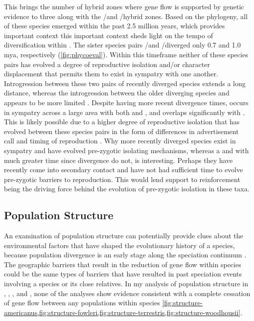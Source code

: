 This brings the number of \anaxyrus hybrid zones where gene flow is supported by genetic evidence to
three along with the \amer/\terr and \amer/\hemiophrys hybrid zones. 
Based on the \phycoeval phylogeny, all of these species emerged within the past 
2.5 million years, which provides important context
this important context sheds light on the tempo of diversification within \anaxyrus.
The sister species pairs \fowl/\wood and \amer/\terr diverged only 0.7 and 1.0 mya,
respectively (\cref{fig:phycoeval}).
Within this timeframe neither of these species pairs has evolved a degree of 
reproductive isolation and/or character displacement that permits them to exist 
in sympatry with one another. 
Introgression between these two pairs of recently diverged species extends a 
long distance, whereas the introgression between the older diverging species 
\amer and \hemiophrys appears to be more limited \parencite{green1983}.
Despite having more recent divergence times, \fowl occurs in sympatry across 
a large area with both \amer and \terr, and \wood overlaps significantly with 
\amer \parencite{conant1998}.
This is likely possible due to a higher degree of reproductive isolation that 
has evolved between these species pairs in the form of differences in 
advertisement call and timing of reproduction \parencite{blair1974}. 
Why more recently diverged species exist in sympatry and have evolved 
pre-zygotic isolating mechanisms, whereas a \amer and \hemiophrys with much 
greater time since divergence do not, is interesting.
Perhaps they have recently come into secondary contact and have not had sufficient
time to evolve pre-zygotic barriers to reproduction. 
This would lend support to reinforcement being the driving force behind the evolution
of pre-zygotic isolation in these taxa. 

\subsection{Population Structure}
An examination of population structure can potentially provide clues about the 
environmental factors that have shaped the evolutionary history of a species,
because population divergence is an early stage along the speciation continuum 
\parencite{mallet2008}.
The geographic barriers that result in the reduction of gene flow within species
could be the same types of barriers that have resulted in past speciation events 
involving a species or its close relatives.
In my analysis of population structure in \amer, \fowl, \terr, and \wood,
none of the \structure analyses show evidence consistent with a complete 
cessation of gene flow between any populations within species 
\cref{fig:structure-americanus,fig:structure-fowleri,fig:structure-terrestris,fig:structure-woodhousii}. 

